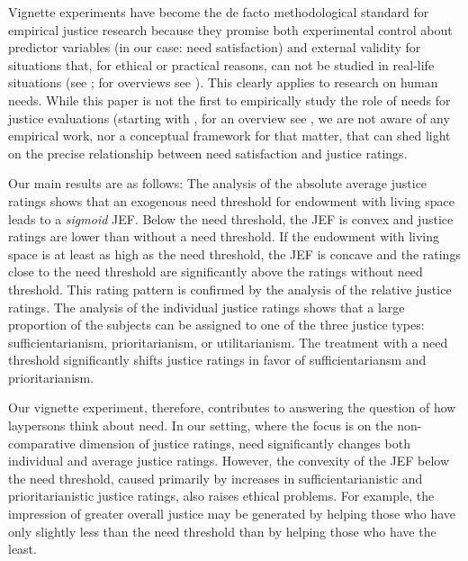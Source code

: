 \documentclass[12pt]{scrartcl}
\begin{document}
Vignette experiments have become the de facto methodological standard for empirical justice research because they promise both experimental control about predictor variables (in our case: need satisfaction) and external validity for situations that, for ethical or practical reasons, can not be studied in real-life situations (see \citealp{bardsley_experimental_2009}; for overviews see \citealp{traub_friedman_2005,gaertner_empirical_2012}).
This clearly applies to research on human needs.
While this paper is not the first to empirically study the role of needs for justice evaluations (starting with \citealp{yaari_dividing_1984}, for an overview see \citep[see][]{traub_need-based_2020}, we are not aware of any empirical work, nor a conceptual framework for that matter, that can shed light on the precise relationship between need satisfaction and justice ratings.

Our main results are as follows: The analysis of the absolute average justice ratings shows that an exogenous need threshold for endowment with living space leads to a \textit{sigmoid} JEF.
Below the need threshold, the JEF is convex and justice ratings are lower than without a need threshold.
If the endowment with living space is at least as high as the need threshold, the JEF is concave and the ratings close to the need threshold are significantly above the ratings without need threshold.
This rating pattern is confirmed by the analysis of the relative justice ratings.
The analysis of the individual justice ratings shows that a large proportion of the subjects can be assigned to one of the three justice types: sufficientarianism, prioritarianism, or utilitarianism.
The treatment with a need threshold significantly shifts justice ratings in favor of sufficientariansm and prioritarianism.

Our vignette experiment, therefore, contributes to answering the question of how laypersons think about need.
In our setting, where the focus is on the non-comparative dimension of justice ratings, need significantly changes both individual and average justice ratings.
However, the convexity of the JEF below the need threshold, caused primarily by increases in sufficientarianistic and prioritarianistic justice ratings, also raises ethical problems.
For example, the impression of greater overall justice may be generated by helping those who have only slightly less than the need threshold than by helping those who have the least.
\end{document}

